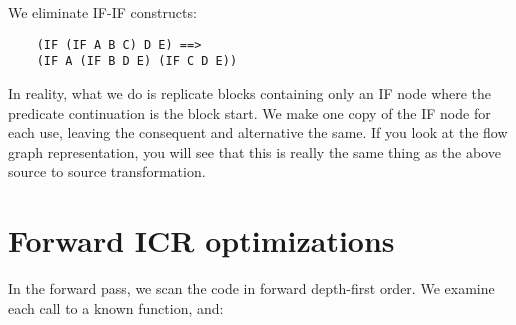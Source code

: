 We eliminate IF-IF constructs:
\begin{verbatim}
    (IF (IF A B C) D E) ==>
    (IF A (IF B D E) (IF C D E))
\end{verbatim}

In reality, what we do is replicate blocks containing only an IF node where the
predicate continuation is the block start.  We make one copy of the IF node for
each use, leaving the consequent and alternative the same.  If you look at the
flow graph representation, you will see that this is really the same thing as
the above source to source transformation.


\section{Forward ICR optimizations}

In the forward pass, we scan the code in forward depth-first order.  We
examine each call to a known function, and:

